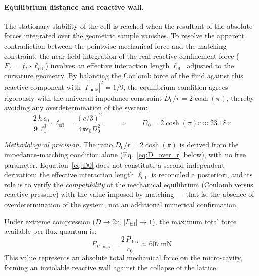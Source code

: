 \documentclass[11pt,a4paper]{article}
\theoremstyle{plain}
\theoremstyle{remark}
\begin{document}
\paragraph{Equilibrium distance and reactive wall.}
The stationary stability of the cell is reached when the resultant of the absolute forces integrated over the geometric sample vanishes. To resolve the apparent contradiction between the pointwise mechanical force and the matching constraint, the near-field integration of the real reactive confinement force ($F_{\Gamma} = f_{\Gamma} \cdot \ell_{\text{eff}}$) involves an effective interaction length $\ell_{\text{eff}}$ adjusted to the curvature geometry. By balancing the Coulomb force of the fluid against this reactive component with $|\Gamma_{\text{pole}}|^2 = 1/9$, the equilibrium condition agrees rigorously with the universal impedance constraint $D_0/r = 2\cosh(\pi)$, thereby avoiding any overdetermination of the system:
\begin{equation}\label{eq:D0}
\frac{2\,h\,c_0}{9\,\ell_1^3} \cdot \ell_{\text{eff}} = \frac{(e/3)^2}{4\pi\epsilon_0 D_0^2} \qquad \Longrightarrow \qquad D_0 = 2\cosh(\pi)r \approx 23.18\,r
\end{equation}

\emph{Methodological precision.} The ratio $D_0/r = 2\cosh(\pi)$ is derived from the impedance-matching condition alone (Eq.~\eqref{eq:D_over_r} below), with no free parameter. Equation~\eqref{eq:D0} does not constitute a second independent derivation: the effective interaction length $\ell_{\text{eff}}$ is reconciled a posteriori, and its role is to verify the \emph{compatibility} of the mechanical equilibrium (Coulomb versus reactive pressure) with the value imposed by matching --- that is, the absence of overdetermination of the system, not an additional numerical confirmation.

Under extreme compression ($D \rightarrow 2r$, $|\Gamma_{\text{bif}}| \rightarrow 1$), the maximum total force available per flux quantum is:
\begin{equation}
F_{\Gamma,\text{max}} = \frac{2\,P_{\text{flux}}}{c_0} \approx 607\,\text{mN}
\end{equation}
This value represents an absolute total mechanical force on the micro-cavity, forming an inviolable reactive wall against the collapse of the lattice.
\end{document}
